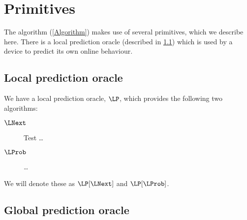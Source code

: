 \section{Primitives}%
\label{Primitives}

The algorithm (\cref{Algorithm}) makes use of several primitives, which we 
describe here.
There is a local prediction oracle (described in \cref{LocalPrediction}) which 
is used by a device to predict its own online behaviour.

\subsection{Local prediction oracle}%
\label{LocalPrediction}


We have a local prediction oracle, \(\LP\), which provides the following two 
algorithms:
\begin{description}
  \item[\(\LNext\)] Test \dots
  \item[\(\LProb\)] \dots
\end{description}
We will denote these as \(\LP[\LNext]\) and \(\LP[\LProb]\).

\subsection{Global prediction oracle}

